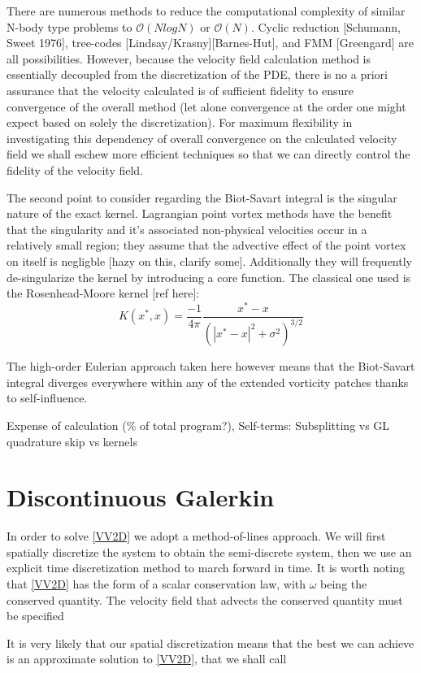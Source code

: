 \documentclass[letterpaper,12pt]{report}
\newcommand{\ben}[1]{\begin{equation}\label{#1}}
\newcommand{\ee}{\end{equation}}
\begin{document}
There are numerous methods to reduce the computational complexity of similar N-body type problems to $\mathcal{O}(NlogN)$ or $\mathcal{O}(N)$. Cyclic reduction [Schumann, Sweet 1976], tree-codes [Lindsay/Krasny][Barnes-Hut], and FMM [Greengard] are all possibilities. However, because the velocity field calculation method is essentially decoupled from the discretization of the PDE, there is no a priori assurance that the velocity calculated is of sufficient fidelity to ensure convergence of the overall method (let alone convergence at the order one might expect based on solely the discretization). For maximum flexibility in investigating this dependency of overall convergence on the calculated velocity field we shall eschew more efficient techniques so that we can directly control the fidelity of the velocity field.

The second point to consider regarding the Biot-Savart integral is the singular nature of the exact kernel. Lagrangian point vortex methods have the benefit that the singularity and it's associated non-physical velocities occur in a relatively small region; they assume that the advective effect of the point vortex on itself is negligble [hazy on this, clarify some]. Additionally they will frequently de-singularize the kernel by introducing a core function. The classical one used is the Rosenhead-Moore kernel [ref here]:
\ben{RMkern} K(x^*,x) = \frac{-1}{4 \pi} \frac{x^*-x}{(|x^*-x|^2+\sigma^2)^{3/2}} \ee

The high-order Eulerian approach taken here however means that the Biot-Savart integral diverges everywhere within any of the extended vorticity patches thanks to self-influence.


Expense of calculation (\% of total program?), Self-terms: Subsplitting vs GL quadrature skip vs kernels

\section{Discontinuous Galerkin}
In order to solve \eqref{VV2D} we adopt a method-of-lines approach. We will first spatially discretize the system to obtain the semi-discrete system, then we use an explicit time discretization method to march forward in time. It is worth noting that \eqref{VV2D} has the form of a scalar conservation law, with $\omega$ being the conserved quantity. The velocity field that advects the conserved quantity must be specified 

It is very likely that our spatial discretization means that the best we can achieve is an approximate solution to \eqref{VV2D}, that we shall call
\end{document}
